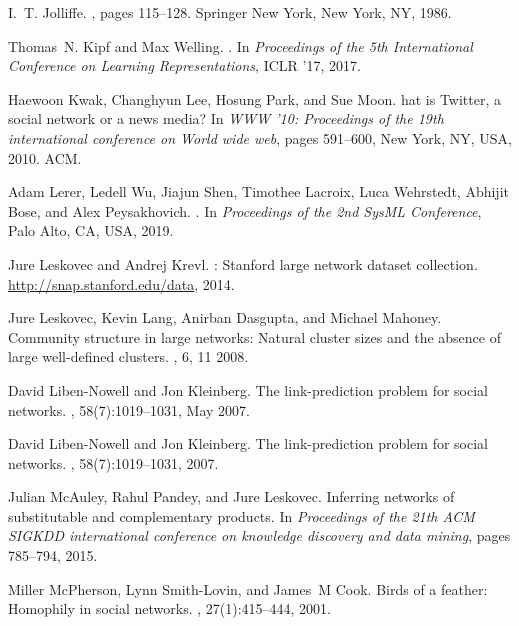 \documentclass{IEEEtran}
\begin{document}
\begin{thebibliography}{00}
I.~T. Jolliffe.
, pages
  115--128.
\newblock Springer New York, New York, NY, 1986.

Thomas~N. Kipf and Max Welling.
.
\newblock In {\em Proceedings of the 5th International Conference on Learning
  Representations}, ICLR '17, 2017.

Haewoon Kwak, Changhyun Lee, Hosung Park, and Sue Moon.
hat is {T}witter, a social network or a news media?
\newblock In {\em WWW '10: Proceedings of the 19th international conference on
  World wide web}, pages 591--600, New York, NY, USA, 2010. ACM.

Adam Lerer, Ledell Wu, Jiajun Shen, Timothee Lacroix, Luca Wehrstedt, Abhijit
  Bose, and Alex Peysakhovich.
.
\newblock In {\em Proceedings of the 2nd SysML Conference}, Palo Alto, CA, USA,
  2019.

Jure Leskovec and Andrej Krevl.
: {Stanford} large network dataset collection.
\newblock \url{http://snap.stanford.edu/data}, 2014.

Jure Leskovec, Kevin Lang, Anirban Dasgupta, and Michael Mahoney.
\newblock Community structure in large networks: Natural cluster sizes and the
  absence of large well-defined clusters.
, 6, 11 2008.

David Liben-Nowell and Jon Kleinberg.
\newblock The link-prediction problem for social networks.
, 58(7):1019–1031, May 2007.

David Liben-Nowell and Jon Kleinberg.
\newblock The link-prediction problem for social networks.
, 58(7):1019--1031, 2007.

Julian McAuley, Rahul Pandey, and Jure Leskovec.
\newblock Inferring networks of substitutable and complementary products.
\newblock In {\em Proceedings of the 21th ACM SIGKDD international conference
  on knowledge discovery and data mining}, pages 785--794, 2015.

Miller McPherson, Lynn Smith-Lovin, and James~M Cook.
\newblock Birds of a feather: Homophily in social networks.
, 27(1):415--444, 2001.


\end{thebibliography}
\end{document}
